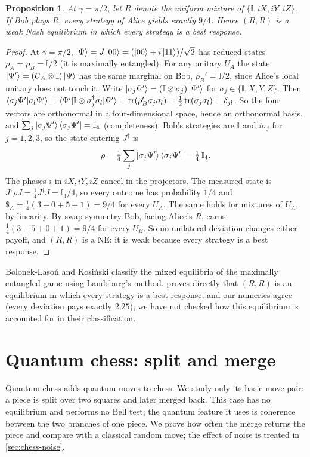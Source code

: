 \documentclass[11pt,a4paper]{article}
\newtheorem{proposition}{Proposition}
\begin{document}
\begin{proposition}\label{prop:focal}
At $\gamma=\pi/2$, let $R$ denote the uniform mixture of $\{\mathbb{I},iX,iY,iZ\}$. If Bob plays $R$, every strategy of Alice yields exactly $9/4$. Hence $(R,R)$ is a weak Nash equilibrium in which every strategy is a best response.
\end{proposition}
\begin{proof}
At $\gamma=\pi/2$, $\ket\Psi=J\ket{00}=(\ket{00}+i\ket{11})/\sqrt2$ has reduced states $\rho_A=\rho_B=\mathbb{I}/2$ (it is maximally entangled). For any unitary $U_A$ the state $\ket{\Psi'}=(U_A\otimes\mathbb{I})\ket\Psi$ has the same marginal on Bob, $\rho_B'=\mathbb{I}/2$, since Alice's local unitary does not touch it. Write $\ket{\sigma_j\Psi'}=(\mathbb{I}\otimes\sigma_j)\ket{\Psi'}$ for $\sigma_j\in\{\mathbb{I},X,Y,Z\}$. Then $\langle\sigma_j\Psi'|\sigma_l\Psi'\rangle=\langle\Psi'|\mathbb{I}\otimes\sigma_j^\dagger\sigma_l|\Psi'\rangle=\tr(\rho_B'\sigma_j\sigma_l)=\tfrac12\tr(\sigma_j\sigma_l)=\delta_{jl}$. So the four vectors are orthonormal in a four-dimensional space, hence an orthonormal basis, and $\sum_j\ket{\sigma_j\Psi'}\bra{\sigma_j\Psi'}=\mathbb{I}_4$ (completeness). Bob's strategies are $\mathbb I$ and $i\sigma_j$ for $j=1,2,3$, so the state entering $J^\dagger$ is
\[
\rho=\tfrac14\sum_j\ket{\sigma_j\Psi'}\bra{\sigma_j\Psi'}=\tfrac14\,\mathbb{I}_4.
\]
The phases $i$ in $iX,iY,iZ$ cancel in the projectors. The measured state is $J^\dagger\rho J=\tfrac14J^\dagger J=\mathbb{I}_4/4$, so every outcome has probability $1/4$ and $\$_A=\tfrac14(3+0+5+1)=9/4$ for every $U_A$. The same holds for mixtures of $U_A$, by linearity. By swap symmetry Bob, facing Alice's $R$, earns $\tfrac14(3+5+0+1)=9/4$ for every $U_B$. So no unilateral deviation changes either payoff, and $(R,R)$ is a NE; it is weak because every strategy is a best response.
\end{proof}
Bolonek-Laso\'n and Kosi\'nski \cite{bolonek} classify the mixed equilibria of the maximally entangled game using Landsburg's method.  proves directly that $(R,R)$ is an equilibrium in which every strategy is a best response, and our numerics agree (every deviation pays exactly $2.25$); we have not checked how this equilibrium is accounted for in their classification.

\FloatBarrier
\section{Quantum chess: split and merge}\label{sec:chess}
Quantum chess \cite{cantwell,qchess} adds quantum moves to chess. We study only its basic move pair: a piece is split over two squares and later merged back. This case has no equilibrium and performs no Bell test; the quantum feature it uses is coherence between the two branches of one piece. We prove how often the merge returns the piece and compare with a classical random move; the effect of noise is treated in \cref{sec:chess-noise}.
\end{document}
